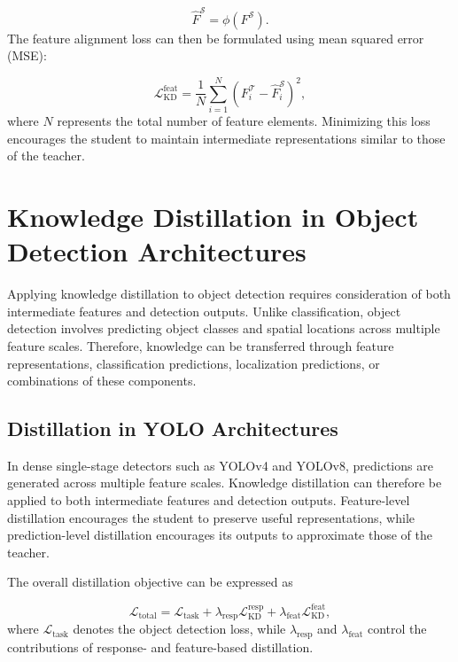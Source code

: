 \begin{equation}
\hat{F}^{\mathcal{S}} = \phi(F^{\mathcal{S}}).
\end{equation}
The feature alignment loss can then be formulated using mean squared error (MSE):

\begin{equation}
\mathcal{L}_{\mathrm{KD}}^{\mathrm{feat}} =
\frac{1}{N}
\sum_{i=1}^{N}
\left(
F_i^{\mathcal{T}} -
\hat{F}_i^{\mathcal{S}}
\right)^2,
\end{equation}
where $N$ represents the total number of feature elements. Minimizing this loss encourages the student to maintain intermediate representations similar to those of the teacher.

\section{Knowledge Distillation in Object Detection Architectures}
\label{sec:kd_architectures}

Applying knowledge distillation to object detection requires consideration of both intermediate features and detection outputs. Unlike classification, object detection involves predicting object classes and spatial locations across multiple feature scales. Therefore, knowledge can be transferred through feature representations, classification predictions, localization predictions, or combinations of these components.

\subsection{Distillation in YOLO Architectures}

In dense single-stage detectors such as YOLOv4 and YOLOv8, predictions are generated across multiple feature scales. Knowledge distillation can therefore be applied to both intermediate features and detection outputs. Feature-level distillation encourages the student to preserve useful representations, while prediction-level distillation encourages its outputs to approximate those of the teacher.

The overall distillation objective can be expressed as

\begin{equation}
\mathcal{L}_{\mathrm{total}} =
\mathcal{L}_{\mathrm{task}}
+
\lambda_{\mathrm{resp}}
\mathcal{L}_{\mathrm{KD}}^{\mathrm{resp}}
+
\lambda_{\mathrm{feat}}
\mathcal{L}_{\mathrm{KD}}^{\mathrm{feat}},
\end{equation}
where $\mathcal{L}_{\mathrm{task}}$ denotes the object detection loss, while $\lambda_{\mathrm{resp}}$ and $\lambda_{\mathrm{feat}}$ control the contributions of response- and feature-based distillation.

